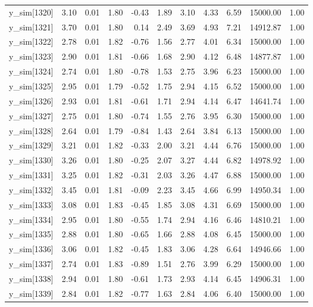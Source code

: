 \begin{table}[ht]
\begin{tabular}{rrrrrrrrrrr}
  y\_sim[1320] & 3.10 & 0.01 & 1.80 & -0.43 & 1.89 & 3.10 & 4.33 & 6.59 & 15000.00 & 1.00 \\ 
  y\_sim[1321] & 3.70 & 0.01 & 1.80 & 0.14 & 2.49 & 3.69 & 4.93 & 7.21 & 14912.87 & 1.00 \\ 
  y\_sim[1322] & 2.78 & 0.01 & 1.82 & -0.76 & 1.56 & 2.77 & 4.01 & 6.34 & 15000.00 & 1.00 \\ 
  y\_sim[1323] & 2.90 & 0.01 & 1.81 & -0.66 & 1.68 & 2.90 & 4.12 & 6.48 & 14877.87 & 1.00 \\ 
  y\_sim[1324] & 2.74 & 0.01 & 1.80 & -0.78 & 1.53 & 2.75 & 3.96 & 6.23 & 15000.00 & 1.00 \\ 
  y\_sim[1325] & 2.95 & 0.01 & 1.79 & -0.52 & 1.75 & 2.94 & 4.15 & 6.52 & 15000.00 & 1.00 \\ 
  y\_sim[1326] & 2.93 & 0.01 & 1.81 & -0.61 & 1.71 & 2.94 & 4.14 & 6.47 & 14641.74 & 1.00 \\ 
  y\_sim[1327] & 2.75 & 0.01 & 1.80 & -0.74 & 1.55 & 2.76 & 3.95 & 6.30 & 15000.00 & 1.00 \\ 
  y\_sim[1328] & 2.64 & 0.01 & 1.79 & -0.84 & 1.43 & 2.64 & 3.84 & 6.13 & 15000.00 & 1.00 \\ 
  y\_sim[1329] & 3.21 & 0.01 & 1.82 & -0.33 & 2.00 & 3.21 & 4.44 & 6.76 & 15000.00 & 1.00 \\ 
  y\_sim[1330] & 3.26 & 0.01 & 1.80 & -0.25 & 2.07 & 3.27 & 4.44 & 6.82 & 14978.92 & 1.00 \\ 
  y\_sim[1331] & 3.25 & 0.01 & 1.82 & -0.31 & 2.03 & 3.26 & 4.47 & 6.88 & 15000.00 & 1.00 \\ 
  y\_sim[1332] & 3.45 & 0.01 & 1.81 & -0.09 & 2.23 & 3.45 & 4.66 & 6.99 & 14950.34 & 1.00 \\ 
  y\_sim[1333] & 3.08 & 0.01 & 1.83 & -0.45 & 1.85 & 3.08 & 4.31 & 6.69 & 15000.00 & 1.00 \\ 
  y\_sim[1334] & 2.95 & 0.01 & 1.80 & -0.55 & 1.74 & 2.94 & 4.16 & 6.46 & 14810.21 & 1.00 \\ 
  y\_sim[1335] & 2.88 & 0.01 & 1.80 & -0.65 & 1.66 & 2.88 & 4.08 & 6.45 & 15000.00 & 1.00 \\ 
  y\_sim[1336] & 3.06 & 0.01 & 1.82 & -0.45 & 1.83 & 3.06 & 4.28 & 6.64 & 14946.66 & 1.00 \\ 
  y\_sim[1337] & 2.74 & 0.01 & 1.83 & -0.89 & 1.51 & 2.76 & 3.99 & 6.29 & 15000.00 & 1.00 \\ 
  y\_sim[1338] & 2.94 & 0.01 & 1.80 & -0.61 & 1.73 & 2.93 & 4.14 & 6.45 & 14906.31 & 1.00 \\ 
  y\_sim[1339] & 2.84 & 0.01 & 1.82 & -0.77 & 1.63 & 2.84 & 4.06 & 6.40 & 15000.00 & 1.00 \\ 

\end{tabular}
\end{table}
